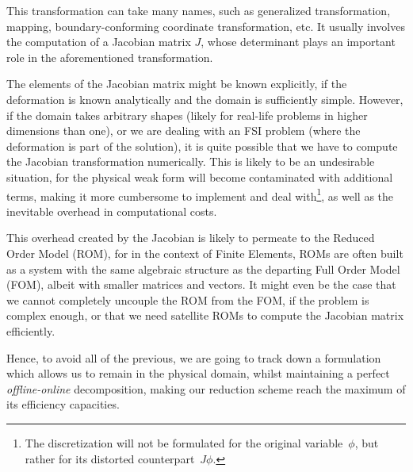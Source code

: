 \documentclass[thesis.tex]{subfiles}
\begin{document}
This transformation can take many names, 
such as generalized transformation, 
mapping,
boundary-conforming coordinate transformation,
etc.
It usually involves the computation of a Jacobian matrix $J$,
whose determinant plays an important role in the aforementioned transformation.

The elements of the Jacobian matrix might be known explicitly,
if the deformation is known analytically and the domain is sufficiently simple.
However, if the domain takes arbitrary shapes 
(likely for real-life problems in higher dimensions than one),
or we are dealing with an FSI problem (where the deformation is part of the solution),
it is quite possible that we have to compute the Jacobian transformation numerically.
This is likely to be an undesirable situation, 
for the physical weak form will become contaminated with additional terms, 
making it more cumbersome to implement and deal with\footnote{
    The discretization will not be formulated for the original variable~$\phi$,
    but rather for its distorted counterpart~$J \phi$.
    },
as well as the inevitable overhead in computational costs.

This overhead created by the Jacobian is likely to permeate to the Reduced Order Model (ROM),
for in the context of Finite Elements, ROMs are often built as a system with the same algebraic structure
as the departing Full Order Model (FOM),
albeit with smaller matrices and vectors. 
It might even be the case that we cannot completely uncouple the ROM from the FOM, 
if the problem is complex enough, or that we need satellite ROMs to compute the Jacobian matrix efficiently.

Hence, to avoid all of the previous, 
we are going to track down a formulation which allows us to remain in the physical domain, 
whilst maintaining a perfect \textit{offline-online} decomposition,
making our reduction scheme reach the maximum of its efficiency capacities.
\end{document}
